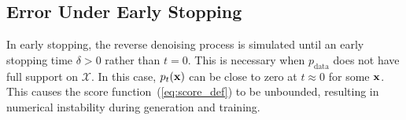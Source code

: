 \documentclass{article} %
\newtheorem{remark}[theorem]{Remark}
\def\eqref#1{equation~\ref{#1}}
\newcommand{\bfx}{{\bf x}}
\renewcommand{\eqref}[1]{\textup{(\ref{#1})}}
\begin{document}







\subsection{Error Under Early Stopping}
In early stopping, the reverse denoising process is simulated until an early stopping time $\delta>0$ rather than $t=0$. This is necessary when $p_\mathrm{data}$ does not have full support on $\mathcal{X}$. In this case, $p_t(\bfx)$ can be close to zero at $t \approx 0$ for some $\bfx$. This causes the score function~\eqref{eq:score_def} to be unbounded, resulting in numerical instability during generation and training. 
\end{document}
